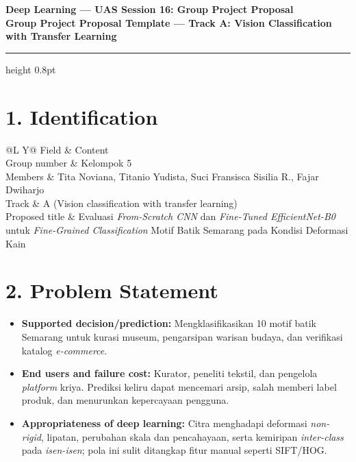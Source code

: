 \documentclass[9pt,a4paper]{extarticle}
\makeatletter
\renewcommand{\arraystretch}{0.92}
\newcommand{\proposalTable}[1]{%
    \renewcommand{\arraystretch}{0.94}%
    \begin{tabularx}{\textwidth}{@{}L Y@{}}
    \toprule[0.7pt]
    \textcolor{muted}{Field} & \textcolor{muted}{Content}\\
    \midrule
    #1
    \bottomrule[0.7pt]
    \end{tabularx}%
}
\makeatother
\begin{document}
\fontsize{8.4pt}{9.6pt}\selectfont

\begin{center}
    {\color{ink}\fontsize{12.5pt}{14pt}\selectfont\bfseries
    Deep Learning --- UAS Session 16: Group Project Proposal}\\[-1pt]
    {\color{accent}\fontsize{8.7pt}{10pt}\selectfont\bfseries
    Group Project Proposal Template --- Track A: Vision Classification with Transfer Learning}
\end{center}
\vspace{1pt}
\hrule height 0.8pt
\vspace{2pt}

\section*{1. Identification}
\proposalTable{%
    Group number & Kelompok 5\\
    Members & Tita Noviana, Titanio Yudista, Suci Fransisca Sisilia R., Fajar Dwiharjo\\
    Track & A (Vision classification with transfer learning)\\
    Proposed title & Evaluasi \textit{From-Scratch CNN} dan \textit{Fine-Tuned EfficientNet-B0} untuk \textit{Fine-Grained Classification} Motif Batik Semarang pada Kondisi Deformasi Kain\\
}

\section*{2. Problem Statement}
\begin{itemize}
    \item \textbf{Supported decision/prediction:} Mengklasifikasikan 10 motif batik Semarang untuk kurasi museum, pengarsipan warisan budaya, dan verifikasi katalog \textit{e-commerce}.
    \item \textbf{End users and failure cost:} Kurator, peneliti tekstil, dan pengelola \textit{platform} kriya. Prediksi keliru dapat mencemari arsip, salah memberi label produk, dan menurunkan kepercayaan pengguna.
    \item \textbf{Appropriateness of deep learning:} Citra menghadapi deformasi \textit{non-rigid}, lipatan, perubahan skala dan pencahayaan, serta kemiripan \textit{inter-class} pada \textit{isen-isen}; pola ini sulit ditangkap fitur manual seperti SIFT/HOG.
\end{itemize}
\end{document}
